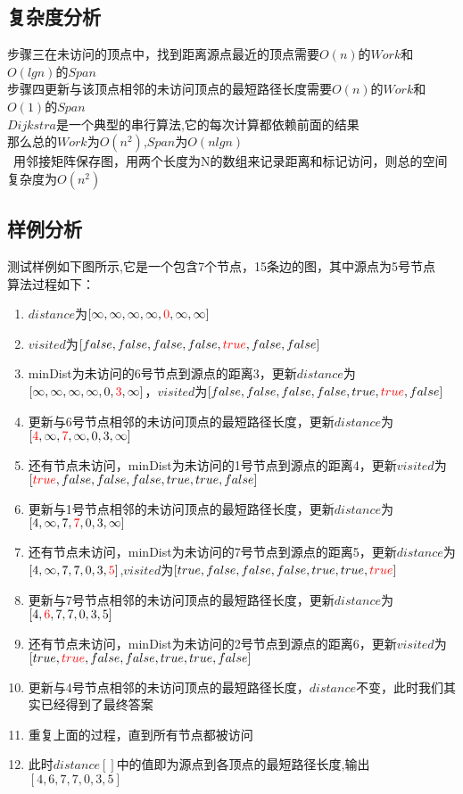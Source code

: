 \documentclass[UTF8,a4paperdui, %
]{ctexart}
\begin{document}
\subsection{复杂度分析}
步骤三在未访问的顶点中，找到距离源点最近的顶点需要$O(n)$的$Work$和$O(lgn)$的$Span$\\
步骤四更新与该顶点相邻的未访问顶点的最短路径长度需要$O(n)$的$Work$和$O(1)$的$Span$\\
$Dijkstra$是一个典型的串行算法,它的每次计算都依赖前面的结果\\
那么总的$Work$为$O(n^2)$,$Span$为$O(nlgn)$\\\
用邻接矩阵保存图，用两个长度为N的数组来记录距离和标记访问，则总的空间复杂度为$O(n^2)$
\subsection{样例分析}
测试样例如下图所示,它是一个包含7个节点，15条边的图，其中源点为5号节点
\\
算法过程如下：
\begin{enumerate}
    \item $distance$为$[\infty,\infty,\infty,\infty,\textcolor{red}{0},\infty,\infty]$
    \item $visited$为$[false,false,false,false,\textcolor{red}{true},false,false]$
    \item minDist为未访问的6号节点到源点的距离3，更新$distance$为$[\infty,\infty,\infty,\infty,0,\textcolor{red}{3},\infty]$，$visited$为$[false,false,false,false,true,\textcolor{red}{true},false]$
    \item 更新与6号节点相邻的未访问顶点的最短路径长度，更新$distance$为$[\textcolor{red}{4},\infty,\textcolor{red}{7},\infty,0,3,\infty]$
    \item 还有节点未访问，minDist为未访问的1号节点到源点的距离4，更新$visited$为$[\textcolor{red}{true},false,false,false,true,true,false]$
    \item 更新与1号节点相邻的未访问顶点的最短路径长度，更新$distance$为$[4,\infty,7,\textcolor{red}{7},0,3,\infty]$
    \item 还有节点未访问，minDist为未访问的7号节点到源点的距离5，更新$distance$为$[4,\infty,7,7,0,3,\textcolor{red}{5}]$,$visited$为$[true,false,false,false,true,true,\textcolor{red}{true}]$
    \item 更新与7号节点相邻的未访问顶点的最短路径长度，更新$distance$为$[4,\textcolor{red}{6},7,7,0,3,5]$
    \item 还有节点未访问，minDist为未访问的2号节点到源点的距离6，更新$visited$为$[true,\textcolor{red}{true},false,false,true,true,false]$
    \item 更新与4号节点相邻的未访问顶点的最短路径长度，$distance$不变，此时我们其实已经得到了最终答案
    \item 重复上面的过程，直到所有节点都被访问
    \item 此时$distance[]$中的值即为源点到各顶点的最短路径长度,输出$[4,6,7,7,0,3,5]$
\end{enumerate}
\end{document}
